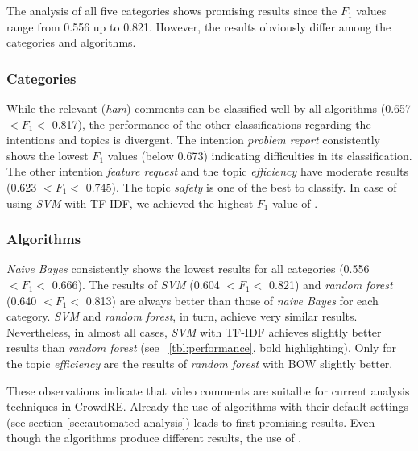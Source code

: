 \documentclass[conference]{IEEEtran}
\begin{document}
{

The analysis of all five categories shows promising results since the $F_{1}$ values range from 0.556 up to 0.821. However, the results obviously differ among the categories and algorithms.

\subsubsection{Categories}
While the relevant (\textit{ham}) comments can be classified well by all algorithms (0.657 $< F_{1} <$ 0.817), the performance of the other classifications regarding the intentions and topics is divergent. The intention \textit{problem report} consistently shows the lowest $F_{1}$ values (below 0.673) indicating difficulties in its classification. The other intention \textit{feature request} and the topic \textit{efficiency} have moderate results (0.623 $< F_{1} <$ 0.745). The topic \textit{safety} is one of the best to classify. In case of using \textit{SVM} with TF-IDF, we achieved the highest $F_{1}$ value of .

\subsubsection{Algorithms}
\textit{Naive Bayes} consistently shows the lowest results for all categories (0.556 $< F_{1} <$ 0.666). The results of \textit{SVM} (0.604 $< F_{1} <$ 0.821) and \textit{random forest} (0.640 $< F_{1} <$ 0.813) are always better than those of \textit{naive Bayes} for each category. \textit{SVM} and \textit{random forest}, in turn, achieve very similar results. Nevertheless, in almost all cases, \textit{SVM} with TF-IDF achieves slightly better results than \textit{random forest} (see \tablename{~\ref{tbl:performance}, bold highlighting}). Only for the topic \textit{efficiency} are the results of \textit{random forest} with BOW slightly better.

These observations indicate that video comments are suitalbe for current analysis techniques in CrowdRE. Already the use of algorithms with their default settings (see section \ref{sec:automated-analysis}) leads to first promising results. Even though the algorithms produce different results, the use of .

}
\end{document}
